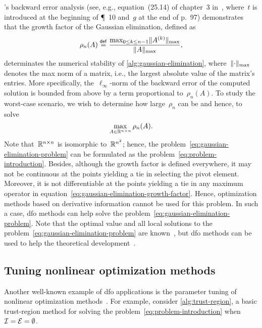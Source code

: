 's backward error analysis (see, e.g., equation~(25.14) of chapter~3 in~\cite{Wilkinson_1963}, where~$t$ is introduced at the beginning of \P~10 and~$g$ at the end of p.~97) demonstrates that the growth factor of the Gaussian elimination, defined as
\begin{equation}
    \label{eq:gaussian-elimination-growth-factor}
    \rho_n(A) \mathrel{\stackrel{\mathsf{def}}{=}} \frac{\max_{0 \le k \le n - 1} \lVert A^{(k)}\rVert_{\max}}{\lVert A\rVert_{\max}},
\end{equation}
determinates the numerical stability of \cref{alg:gaussian-elimination}, where~$\lVert\cdot\rVert_{\max}$ denotes the max norm of a matrix, i.e., the largest absolute value of the matrix's entries.
More specifically, the~$\ell_{\infty}$-norm of the backward error of the computed solution is bounded from above by a term proportional to~$\rho_n(A)$.
To study the worst-case scenario, we wish to determine how large~$\rho_n$ can be and hence, to solve
\begin{equation}
    \label{eq:gaussian-elimination-problem}
    \max_{A \in \mathbb{R}^{n \times n}} \rho_n(A).
\end{equation}
Note that~$\mathbb{R}^{n \times n}$ is isomorphic to~$\mathbb{R}^{n^2}$; hence, the problem~\cref{eq:gaussian-elimination-problem} can be formulated as the problem~\cref{eq:problem-introduction}.
Besides, although the growth factor is defined everywhere, it may not be continuous at the points yielding a tie in selecting the pivot element.
Moreover, it is not differentiable at the points yielding a tie in any maximum operator in equation~\cref{eq:gaussian-elimination-growth-factor}.
Hence, optimization methods based on derivative information cannot be used for this problem.
In such a case, \gls{dfo} methods can help solve the problem~\cref{eq:gaussian-elimination-problem}.
Note that the optimal value and all local solutions to the problem~\cref{eq:gaussian-elimination-problem} are known~\cite{Higham_Higham_1989}, but \gls{dfo} methods can be used to help the theoretical development~\cite{Higham_1993}.

\subsection{Tuning nonlinear optimization methods}

Another well-known example of \gls{dfo} applications is the parameter tuning of nonlinear optimization methods~\cite{Audet_Orban_2006}.
For example, consider \cref{alg:trust-region}, a basic trust-region method for solving the problem~\cref{eq:problem-introduction} when~$\mathcal{I} = \mathcal{E} = \emptyset$.

